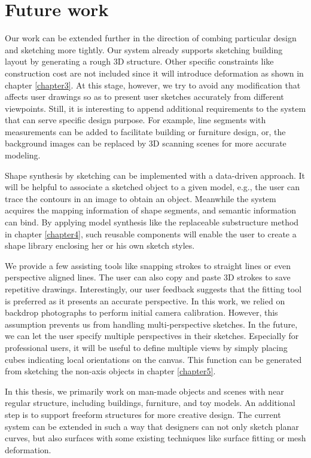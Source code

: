 \section{Future work}
\label{sec:future}

Our work can be extended further in the direction of combing particular design and sketching more tightly. Our system already supports sketching building layout by generating a rough 3D structure. Other specific constraints like construction cost are not included since it will introduce deformation as shown in chapter \ref{chapter3}. At this stage, however, we try to avoid any modification that affects user drawings so as to present user sketches accurately from different viewpoints. Still, it is interesting to append additional requirements to the system that can serve specific design purpose. For example, line segments with measurements can be added to facilitate building or furniture design, or, the background images can be replaced by 3D scanning scenes for more accurate modeling.

Shape synthesis by sketching can be implemented with a data-driven approach. It will be helpful to associate a sketched object to a given model, e.g., the user can trace the contours in an image to obtain an object. Meanwhile the system acquires the mapping information of shape segments, and semantic information can bind. By applying model synthesis like the replaceable substructure method in chapter \ref{chapter4}, such reusable components will enable the user to create a shape library enclosing her or his own sketch styles.

We provide a few assisting tools like snapping strokes to straight lines or even perspective aligned lines. The user can also copy and paste 3D strokes to save repetitive drawings. Interestingly, our user feedback suggests that the fitting tool is preferred as it presents an accurate perspective. In this work, we relied on backdrop photographs to perform initial camera calibration. However, this assumption prevents us from handling multi-perspective sketches. In the future, we can let the user specify multiple perspectives in their sketches. Especially for professional users, it will be useful to define multiple views by simply placing cubes indicating local orientations on the canvas. This function can be generated from sketching the non-axis objects in chapter \ref{chapter5}.

In this thesis, we primarily work on man-made objects and scenes with near regular structure, including buildings, furniture, and toy models. An additional step is to support freeform structures for more creative design. The current system can be extended in such a way that designers can not only sketch planar curves, but also surfaces with some existing techniques like surface fitting or mesh deformation.

